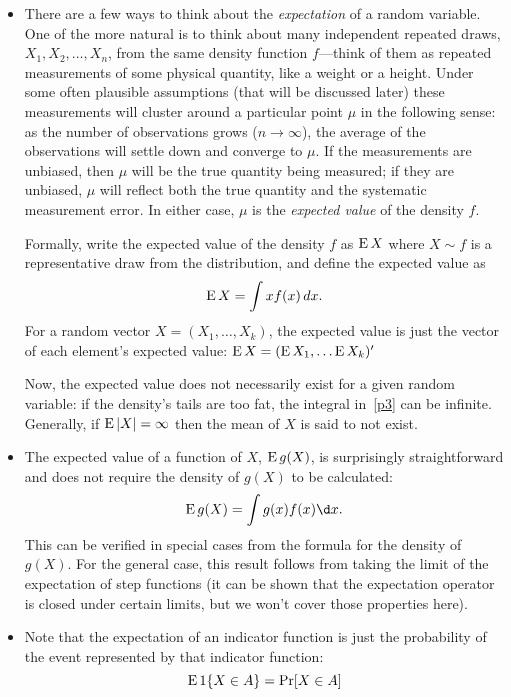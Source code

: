 \begin{itemize}
\item There are a few ways to think about the \emph{expectation} of a
  random variable.  One of the more natural is to think about many
  independent repeated draws, $X_1, X_2,\dots,X_n$, from the same density
  function $f$---think of them as repeated measurements of some physical
  quantity, like a weight or a height.  Under some often plausible
  assumptions (that will be discussed later) these measurements
  will cluster around a particular point $\mu$ in the following sense:
  as the number of observations grows ($n \to \infty$), the average of the
  observations will settle down and converge to $\mu$.  If the
  measurements are unbiased, then $\mu$ will be the true quantity being
  measured; if they are unbiased, $\mu$ will reflect both the true
  quantity and the systematic measurement error.  In either case, $\mu$
  is the \emph{expected value} of the density $f$.

  Formally, write the expected value of the density $f$ as $\operatorname{E} X$
  where $X \sim f$ is a representative draw from the distribution, and
  define the expected value as
  \begin{equation}\label{p3}
    \E X = \int x f(x) \dx.
  \end{equation}
  For a random vector $X = (X_1,\dots,X_k)$, the expected value is just the
  vector of each element's expected value:
  $\operatorname{E} X = (\operatorname{E} X_1,\dots \operatorname{E} X_k)'$

  Now, the expected value does not necessarily exist for a given
  random variable: if the density's tails are too fat, the integral
  in~\eqref{p3} can be infinite.  Generally, if $\operatorname{E} |X| = \infty$ then
  the mean of $X$ is said to not exist.

\item The expected value of a function of $X$, $\operatorname{E} g(X)$, is
  surprisingly straightforward and does not require the density of
  $g(X)$ to be calculated:
  \begin{equation*}
    \E g(X) = \int g(x) f(x) \d x.
  \end{equation*}
  This can be verified in special cases from the formula for the
  density of $g(X)$.  For the general case, this result follows from
  taking the limit of the expectation of step functions (it can be
  shown that the expectation operator is closed under certain limits,
  but we won't cover those properties here).

\item Note that the expectation of an indicator function is just the
  probability of the event represented by that indicator function:
  \begin{equation*}
    \operatorname{E} \operatorname{1}\{ X \in A \} = \operatorname{Pr}[X \in A]
  \end{equation*}


\end{itemize}
